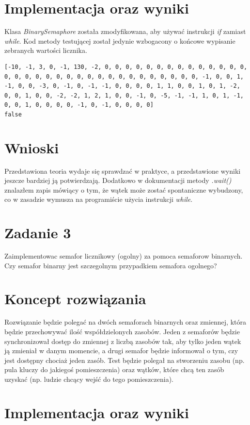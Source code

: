 \documentclass[12pt]{article}
\begin{document}
\section{Implementacja oraz wyniki}
Klasa \emph{BinarySemaphore} została zmodyfikowana, aby używać instrukcji \emph{if} zamiast \emph{while}. Kod metody testującej został jedynie wzbogacony o końcowe wypisanie zebranych wartości licznika.

\begin{verbatim}
[-10, -1, 3, 0, -1, 130, -2, 0, 0, 0, 0, 0, 0, 0, 0, 0, 0, 0, 0, 0, 0, 0, 0, 0, 0, 0, 0, 0, 0, 0, 0, 0, 0, 0, 0, 0, 0, 0, 0, 0, -1, 0, 0, 1, -1, 0, 0, -3, 0, -1, 0, -1, -1, 0, 0, 0, 0, 1, 1, 0, 0, 1, 0, 1, -2, 0, 0, 1, 0, 0, -2, -2, 1, 2, 1, 0, 0, -1, 0, -5, -1, -1, 1, 0, 1, -1, 0, 0, 1, 0, 0, 0, 0, -1, 0, -1, 0, 0, 0, 0]
false
\end{verbatim}

\section{Wnioski}
Przedstawiona teoria wydaje się sprawdzać w praktyce, a przedstawione wyniki jeszcze bardziej ją potwierdzają.
Dodatkowo w dokumentacji metody \emph{.wait()} znalazłem zapis mówiący o tym, że wątek może zostać spontaniczne wybudzony, co w zasadzie wymusza na programiście użycia instrukcji \emph{while}.


\section{Zadanie 3}
Zaimplementowac semafor licznikowy (ogolny) za pomoca semaforow binarnych. Czy semafor binarny jest szczegolnym przypadkiem semafora ogolnego?

\section{Koncept rozwiązania}
Rozwiązanie będzie polegać na dwóch semaforach binarnych oraz zmiennej, która będzie przechowywać ilość współdzielonych zasobów. Jeden z semaforów będzie synchronizował dostęp do zmiennej z liczbą zasobów tak, aby tylko jeden wątek ją zmieniał w danym momencie, a drugi semafor będzie informował o tym, czy jest dostępny chociaż jeden zasób.
Test będzie polegał na stworzeniu zasobu (np. pula kluczy do jakiegoś pomieszczenia) oraz wątków, które chcą ten zasób uzyskać (np. ludzie chcący wejść do tego pomieszczenia).

\newpage
\section{Implementacja oraz wyniki}
\end{document}
